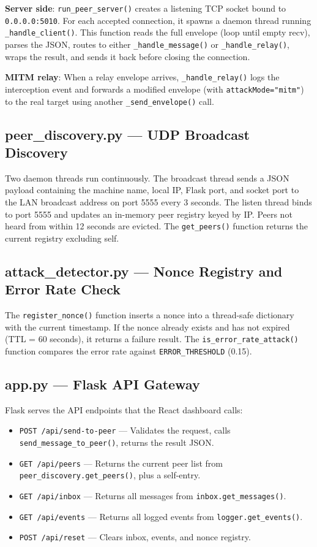 \textbf{Server side}: \texttt{run\_peer\_server()} creates a listening TCP socket bound to \texttt{0.0.0.0:5010}. For each accepted connection, it spawns a daemon thread running \texttt{\_handle\_client()}. This function reads the full envelope (loop until empty recv), parses the JSON, routes to either \texttt{\_handle\_message()} or \texttt{\_handle\_relay()}, wraps the result, and sends it back before closing the connection.

\textbf{MITM relay}: When a relay envelope arrives, \texttt{\_handle\_relay()} logs the interception event and forwards a modified envelope (with \texttt{attackMode="mitm"}) to the real target using another \texttt{\_send\_envelope()} call.

\subsection{peer\_discovery.py --- UDP Broadcast Discovery}

Two daemon threads run continuously. The broadcast thread sends a JSON payload containing the machine name, local IP, Flask port, and socket port to the LAN broadcast address on port 5555 every 3 seconds. The listen thread binds to port 5555 and updates an in-memory peer registry keyed by IP. Peers not heard from within 12 seconds are evicted. The \texttt{get\_peers()} function returns the current registry excluding self.

\subsection{attack\_detector.py --- Nonce Registry and Error Rate Check}

The \texttt{register\_nonce()} function inserts a nonce into a thread-safe dictionary with the current timestamp. If the nonce already exists and has not expired (TTL = 60 seconds), it returns a failure result. The \texttt{is\_error\_rate\_attack()} function compares the error rate against \texttt{ERROR\_THRESHOLD} (0.15).

\subsection{app.py --- Flask API Gateway}

Flask serves the API endpoints that the React dashboard calls:
\begin{itemize}
    \item \texttt{POST /api/send-to-peer} --- Validates the request, calls \texttt{send\_message\_to\_peer()}, returns the result JSON.
    \item \texttt{GET /api/peers} --- Returns the current peer list from \texttt{peer\_discovery.get\_peers()}, plus a self-entry.
    \item \texttt{GET /api/inbox} --- Returns all messages from \texttt{inbox.get\_messages()}.
    \item \texttt{GET /api/events} --- Returns all logged events from \texttt{logger.get\_events()}.
    \item \texttt{POST /api/reset} --- Clears inbox, events, and nonce registry.
\end{itemize}

